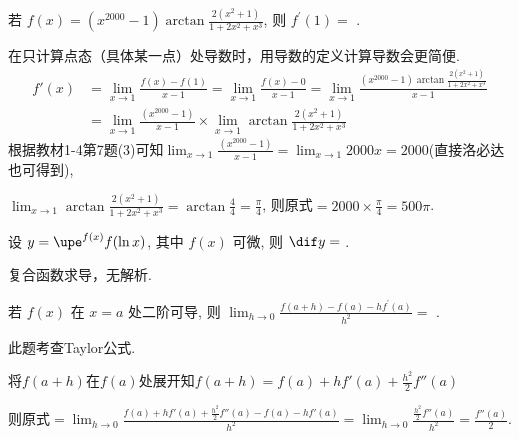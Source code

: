 \documentclass{CWNUExam}
\begin{document}
\begin{problem}
  若 $f(x)=\left(x^{2000}-1\right) \arctan \frac{2\left(x^{2}+1\right)}{1+2 x^{2}+x^{3}}$, 则 $f^{\prime}(1)=$
  \fillin[$500 \pi $].
\end{problem}

\begin{analysis}
  在只计算点态（具体某一点）处导数时，用导数的定义计算导数会更简便.
  \begin{align*}
    f'(x) & = \lim_{x \to 1} \frac{f(x) - f(1)}{x - 1} = \lim_{x \to 1} \frac{f(x) - 0}{x - 1} = \lim_{x \to 1} \frac{\left(x^{2000}-1\right) \arctan \frac{2\left(x^{2}+1\right)}{1+2 x^{2}+x^{3}}}{x - 1} \\
          & = \lim_{x \to 1} \frac{\left(x^{2000}-1\right)}{x - 1}
    \times \lim_{x \to 1} \arctan \frac{2\left(x^{2}+1\right)}{1+2 x^{2}+x^{3}}
  \end{align*}
  根据教材1-4第7题(3)可知$\lim_{x \to 1} \frac{\left(x^{2000}-1\right)}{x - 1} = \lim_{x \to 1} 2000x = 2000$(直接洛必达也可得到),

  $\lim_{x \to 1} \arctan \frac{2\left(x^{2}+1\right)}{1+2 x^{2}+x^{3}}$$= \arctan \frac{4}{4} = \frac{\pi}{4}$,
    则原式$=2000 \times \frac{\pi}{4} = 500 \pi$.
\end{analysis}

\begin{problem}
  设 $y=\upe^{f(x)} f(\ln x)$, 其中 $f(x)$ 可微, 则 $ \dif y=$
  .
\end{problem}

\begin{analysis}
  复合函数求导，无解析.
\end{analysis}

\begin{problem}
  若 $f(x)$ 在 $x=a$ 处二阶可导, 则 $\lim _{h \to 0} \frac{f(a+h)-f(a)-h f^{\prime}(a)}{h^{2}}=$
  \fillin[$\frac{1}{2} f''(a) $].
\end{problem}

\begin{analysis}
  此题考查Taylor公式.

  将$f(a+h)$在$f(a)$处展开知$f(a+h) = f(a) + hf'(a)+\frac{h^2}{2}f''(a)$

  则原式$= \lim _{h \to 0} \frac{f(a) + hf'(a)+\frac{h^2}{2}f''(a) - f(a) - hf'(a)}{h^2} = \lim _{h \to 0} \frac{\frac{h^2}{2}f''(a)}{h^2} = \frac{f''(a)}{2}$.
\end{analysis}
\end{document}
